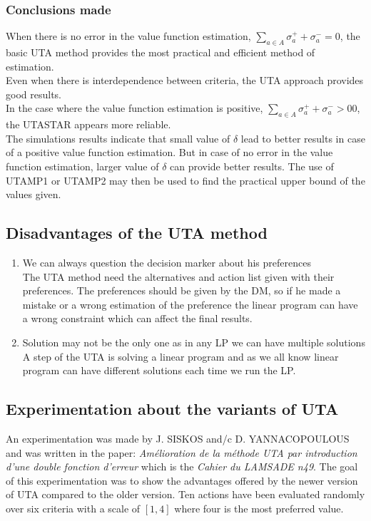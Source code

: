 \documentclass{report}
\begin{document}
\subsubsection{Conclusions made}
When there is no error in the value function estimation, $ \sum_{a \in A} \sigma _{a}^{+} + \sigma _{a}^{-} = 0$, the basic UTA method provides the most practical and efficient method of estimation. \\
Even when there is interdependence between criteria, the UTA approach provides good results. \\
In the case where the value function estimation is positive, $ \sum_{a \in A} \sigma _{a}^{+} + \sigma _{a}^{-} >0 0$, the UTASTAR appears more reliable.\\
The simulations results indicate that small value of $\delta$ lead to better results in case of a positive value function estimation. But in case of no error in the value function estimation, larger value of $\delta$ can provide better results. The use of UTAMP1 or UTAMP2 may then be used to find the practical upper bound of the values given. 

\subsection{Disadvantages of the UTA method}
\begin{enumerate}
\item We can always question the decision marker about his preferences\\
The UTA method need the alternatives and action list given with their preferences. The preferences should be given by the DM, so if he made a mistake or a wrong estimation of the preference the linear program can have a wrong constraint which can affect the final results. 
\item Solution may not be the only one as in any LP we can have multiple solutions\\
A step of the UTA is solving a linear program and as we all know linear program can have different solutions each time we run the LP.
\end{enumerate}

\subsection{Experimentation about the variants of UTA}
An experimentation was made by J. SISKOS and/c D. YANNACOPOULOUS and was written in the paper: \textit{Amélioration de la méthode UTA par introduction d'une double fonction d'erreur} which is the \textit{Cahier du LAMSADE n49}. The goal of this experimentation was to show the advantages offered by the newer version of UTA compared to the older version. Ten actions have been evaluated randomly over six criteria with a scale of $[1,4]$ where four is the most preferred value.\\
\end{document}
